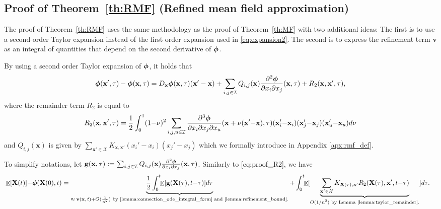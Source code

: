 \documentclass[acmsmall]{acmart}
\newcommand\bx{\mathbf{x}}
\newcommand\bX{\mathbf{X}}
\newcommand\bg{\mathbf{g}}
\newcommand\bv{\mathbf{v}}
\newcommand\bphi{\text{\boldmath$\phi$}}
\newcommand\calX{\mathcal{X}}
\newcommand\calI{\mathcal{I}}
\DeclareMathOperator{\E}{\mathbb{E}} %
\begin{document}

\subsection{Proof of Theorem~\ref{th:RMF} (Refined mean field approximation)}
\label{sec:proof_rmf}

The proof of Theorem~\ref{th:RMF} uses the same methodology as the proof of Theorem~\ref{th:MF} with two additional ideas: 
The first is to use a second-order Taylor expansion instead of the first order expansion used in \eqref{eq:expansion2}. The second is to express the refinement term $\bv$ as an integral of quantities that depend on the second derivative of $\bphi$.

By using a second order Taylor expansion of $\bphi$, it holds that
\begin{align}
  \label{eq:expansion3}
  \bphi(\bx',\tau) - \bphi(\bx, \tau) = D_\bx \bphi(\bx, \tau)(\bx'-\bx) + \sum_{i,j \in \calI} Q_{i,j}(\bx) \frac{\partial^2 \bphi}{\partial x_{i} \partial x_{j}} (\bx, \tau) +  R_2(\bx, \bx', \tau),
\end{align}
where the remainder term $R_2$ is equal to
\begin{align*}
  R_2(\bx,\bx',\tau)=\frac{1}{2} \int_0^1 (1{-}\nu)^2 \sum_{i,j,u\in\calI} \frac{\partial^3 \bphi}{\partial x_{i} \partial x_{j} \partial x_{u}} (\bx + \nu(\bx'{-}\bx) , \tau) (\bx'_i{-}\bx_i)(\bx'_j{-}\bx_j)(\bx'_u{-}\bx_u)d\nu
\end{align*} \color{myorange}
and $Q_{i,j}(\bx)$ is given by $\sum_{\bx' \in \calX} K_{\bx, \bx'}(x_i' - x_i)(x_j' - x_j) $ which we formally introduce in Appendix \ref{apx:rmf_def}. \color{black}

To simplify notations, let $\bg(\bx, \tau) := \sum_{i,j \in \calI} Q_{i,j}(\bx) \frac{\partial^2 \bphi}{\partial x_{i} \partial x_{j}} (\bx, \tau)$. Similarly to \eqref{eq:proof_R2}, we have
\begin{align}
  \label{eq:proof_R3}
& \E[\bX(t)] {-} \bphi(\bX(0),t)= \underbrace{\frac{1}{2}\int_0^t\!\! \E [ \bg(\bX(\tau),t{-}\tau)]d\tau}_{\text{$\approx \bv(\bx,t){+}O(\frac{1}{n^2})$ by \ref{lemma:connection_ode_integral_form} and \ref{lemma:refinement_bound}.}} + \int_0^t \!\!\E [ \underbrace{\sum_{\bx' \in \calX}K_{\bX(\tau),\bx'}R_2(\bX(\tau),\bx',t{-}\tau)}_{\text{$O(1/n^2)$ by Lemma~\ref{lemma:taylor_remainder}.}} ] d\tau.
\end{align}
\end{document}
